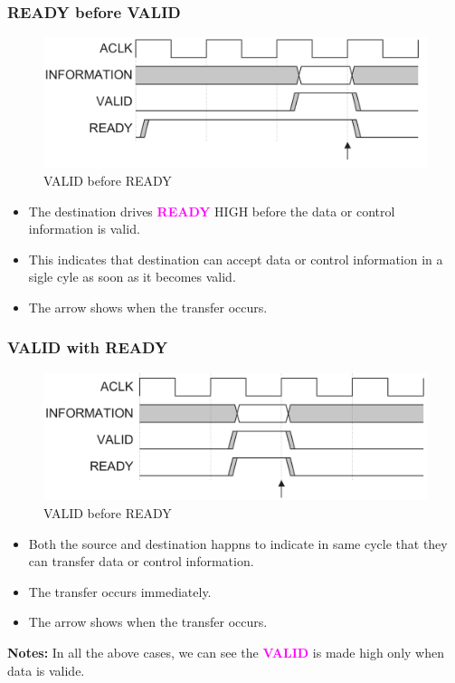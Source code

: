 \documentclass{article}
\newcommand{\AXISignals}[1]{\textbf{\textcolor{magenta}{#1}}}
\begin{document}
\subsubsection*{READY before VALID}
\begin{figure}[H]
    \centering
    \includegraphics[width=1\textwidth]{Resources/ReadyBeforeValid.png}
    \caption{VALID before READY}
\end{figure}
\begin{itemize}
    \item The destination drives \AXISignals{READY} HIGH before the data or control information is valid.
    \item This indicates that destination can accept data or control information in a sigle cyle as soon as it becomes valid.
    \item The arrow shows when the transfer occurs.
\end{itemize}

\subsubsection*{VALID with READY}
\begin{figure}[H]
    \centering
    \includegraphics[width=1\textwidth]{Resources/ReadyWithValid.png}
    \caption{VALID before READY}
\end{figure}
\begin{itemize}
    \item Both the source and destination happns to indicate in same cycle that they can transfer data or control information.
    \item The transfer occurs immediately.
    \item The arrow shows when the transfer occurs.
\end{itemize}
\textbf{Notes: }In all the above cases, we can see the \AXISignals{VALID}  is made high only when data is valide.
\end{document}
